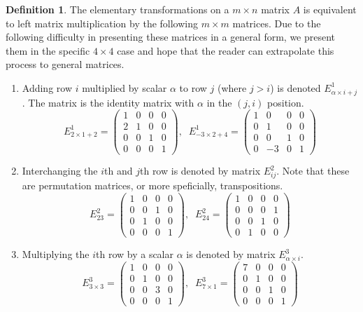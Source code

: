 \documentclass{article}
\theoremstyle{remark}
\theoremstyle{definition}
\newtheorem{definition}{Definition}[section]
\begin{document}
    \begin{definition}
      The elementary transformations on a $m \times n$ matrix $A$ is equivalent to left matrix multiplication by the following $m \times m$ matrices. Due to the following difficulty in presenting these matrices in a general form, we present them in the specific $4 \times 4$ case and hope that the reader can extrapolate this process to general matrices. 
      \begin{enumerate}
        \item Adding row $i$ multiplied by scalar $\alpha$ to row $j$ (where $j > i$) is denoted $E^1_{\alpha \times i + j}$. The matrix is the identity matrix with $\alpha$ in the $(j, i)$ position. 
          \[E^1_{2 \times 1 + 2} = \begin{pmatrix}
          1&0&0&0 \\ 2&1&0&0 \\ 0&0&1&0 \\ 0&0&0&1
          \end{pmatrix}, \;\; E^1_{-3 \times 2 + 4} = \begin{pmatrix}
          1&0&0&0 \\ 0&1&0&0 \\ 0&0&1&0 \\ 0&-3&0&1
          \end{pmatrix}\]
        \item Interchanging the $i$th and $j$th row is denoted by matrix $E^2_{i j}$. Note that these are permutation matrices, or more speficially, transpositions. 
          \[ E^2_{2 3} = \begin{pmatrix}
          1&0&0&0 \\ 0&0&1&0 \\ 0&1&0&0 \\ 0&0&0&1
          \end{pmatrix}, \; \; E^2_{2 4} = \begin{pmatrix}
          1&0&0&0 \\ 0&0&0&1 \\ 0&0&1&0 \\ 0&1&0&0
          \end{pmatrix}\]
        \item Multiplying the $i$th row by a scalar $\alpha$ is denoted by matrix $E^3_{\alpha \times i}$. 
          \[ E^3_{3 \times 3} = \begin{pmatrix}
          1&0&0&0 \\ 0&1&0&0 \\ 0&0&3&0 \\ 0&0&0&1
          \end{pmatrix}, \;\; E^3_{7 \times 1} = \begin{pmatrix}
          7&0&0&0 \\ 0&1&0&0 \\ 0&0&1&0 \\ 0&0&0&1
          \end{pmatrix}\]
      \end{enumerate}
    \end{definition}
\end{document}
